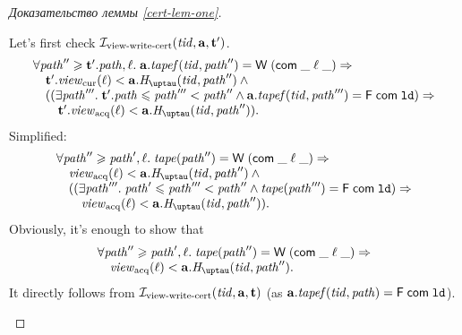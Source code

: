 \begin{proof}[Доказательство леммы \ref{cert-lem-one}]
\begin{itemize}
      Let's first check $\mathcal{I}_{\textup{\rm view-write-cert}}(\mathit{tid}, \mathbf{a}, \mathbf{t}')$.
      \[\begin{array}{l}
  \forall \cpath'' \ge \tT'.\cpath, \loc. \; \aT.\tapef(\tId, \cpath'') = \tapeWrite{(\tapeWriteCommitted{\_}{\loc}{\_})} \Rightarrow \\
  \quad \tT'.\Rcur(\loc) < \aT.\tmap(\tId, \cpath'') \land {} \\
  \quad ((\exists \cpath'''. \; \tT'.\cpath \le \cpath''' < \cpath'' \land 
             \aT.\tapef(\tId, \cpath''') = \tapeFence{\Committed}{\LD}) \Rightarrow \\
  \quad \quad \tT'.\Racq(\loc) < \aT.\tmap(\tId, \cpath'')).\\
      \end{array}\]
      Simplified:
      \[\begin{array}{l}
  \forall \cpath'' \ge \cpath', \loc. \; \tape(\cpath'') = \tapeWrite{(\tapeWriteCommitted{\_}{\loc}{\_})} \Rightarrow \\
  \quad \Racq(\loc) < \aT.\tmap(\tId, \cpath'') \land {} \\
  \quad ((\exists \cpath'''. \; \cpath' \le \cpath''' < \cpath'' \land 
             \tape(\cpath''') = \tapeFence{\Committed}{\LD}) \Rightarrow \\
  \quad \quad \Racq(\loc) < \aT.\tmap(\tId, \cpath'')).\\
      \end{array}\]
      Obviously, it's enough to show that
      \[\begin{array}{l}
  \forall \cpath'' \ge \cpath', \loc. \; \tape(\cpath'') = \tapeWrite{(\tapeWriteCommitted{\_}{\loc}{\_})} \Rightarrow \\
  \quad \Racq(\loc) < \aT.\tmap(\tId, \cpath'').
      \end{array}\]
      It directly follows from $\mathcal{I}_{\textup{\rm view-write-cert}}(\mathit{tid}, \mathbf{a}, \mathbf{t})$ (as $\mathbf{a}.\mathit{tapef}(\mathit{tid}, \mathit{path}) = \textsf{F} \; \mathsf{com} \; \mathtt{ld}$).


\end{itemize}
\end{proof}
